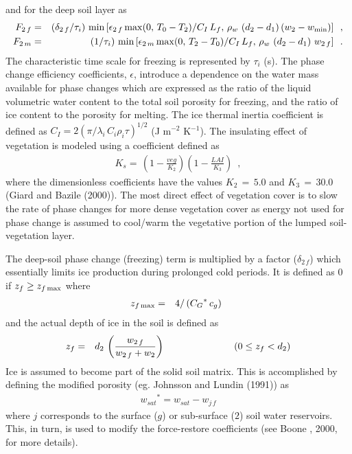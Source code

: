 %
and for the deep soil layer as
%
\begin{eqnarray}
F_{2\,f} &=& \left(\delta_{2\,f}/\tau_i \right)\,{\rm min} \left[
\epsilon_{2\,f} \,{\rm max}(0,\,T_0-T_2)/C_I \, L_f , \,
\rho_w\,\left(d_2-d_1\right)\left( w_2-w_{\rm min}\right)\right]
\,\,\, ,\\
%
F_{2\,m} &=& \left(1/\tau_i \right)\,{\rm min} \left[
\epsilon_{2\,m} \,{\rm max}(0,\,T_2-T_0)/C_I \, L_f , \,
\rho_w\,\left(d_2-d_1\right)\,w_{2\,f}\right]
\,\,\,.
\end{eqnarray}
%
The characteristic time scale for freezing is represented by $\tau_i$ (s).
The phase change efficiency coefficients, $\epsilon$, introduce
a dependence on the water mass available for phase changes
which are expressed as
the ratio of the liquid volumetric water content
to the total soil porosity for freezing,
and the ratio of ice content to the porosity for melting.
The ice thermal inertia coefficient is defined as
$C_I = 2 {\left( {\pi/\lambda_i\,C_i\rho_i\tau} \right)}^{1/2}$
(J m$^{-2}$ K$^{-1}$).
The insulating effect of vegetation is modeled using a coefficient
defined as
%
\begin{eqnarray}
K_s =
\, \left(1-\frac{veg}{ K_2}\right) \left(1-\frac{LAI}{ K_3}\right) \,\,\,,
\end{eqnarray}
%
where the dimensionless coefficients have
the values $K_2\,=\,5.0$ and $K_3\,=\,30.0$ (Giard and Bazile (2000)\nocite{Giard2000}).
The most direct
effect of vegetation cover
is to slow the rate of phase changes for more dense vegetation cover
as energy not used for phase change is assumed to cool/warm the
vegetative portion of the lumped soil-vegetation layer.

The deep-soil phase change (freezing) term
is multiplied by a factor ($\delta_{2\,f}$)
which essentially limits ice production during prolonged
cold periods.  It is defined as 0 if $z_f \geq z_{f\,{\rm max}}$
where
%
\begin{eqnarray}
z_{f\,{\rm max}} &=& 4/\left( {C_G}^\ast\,c_g\right)
\,\,\,
\end{eqnarray}
and the actual depth of ice in the soil is defined as
\begin{eqnarray}
z_f &=& d_2 \, \left(\frac{w_{2\,f}}{ w_{2\,f} + w_2}\right)
\hskip1.in \left(0 \leq z_f < d_2\right)
\end{eqnarray}
%
Ice is assumed to become
part of the solid soil matrix. This is accomplished by
defining the modified porosity
(eg. Johnsson and Lundin (1991)\nocite{Johnsson1991}) as
%
\begin{eqnarray}
{w_{sat}}^\ast = w_{sat} - w_{j\,f}
\end{eqnarray}
%
where $j$ corresponds to the surface ($g$) or sub-surface ($2$)
soil water reservoirs.
This, in turn, is used to modify the force-restore coefficients
(see Boone \etal, 2000, for more details).

